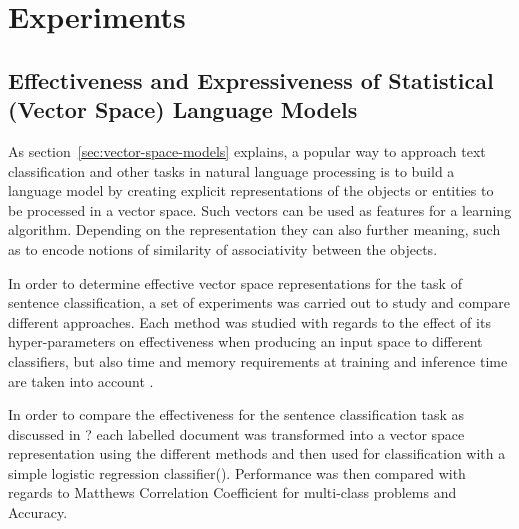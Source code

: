 
\clearpage
\section{Experiments}


\subsection{Effectiveness and Expressiveness of Statistical (Vector Space) Language Models}


As section~\ref{sec:vector-space-models} explains, a popular way to approach text classification and other tasks in natural language processing is to build a language model by creating explicit representations of the objects or entities to be processed in a vector space. Such vectors can be used as features for a learning algorithm. Depending on the representation they can also further meaning, such as to encode notions of similarity of associativity between the objects.

In order to determine effective vector space representations for the task of sentence classification, a set of experiments was carried out to study and compare different approaches. Each method was studied with regards to the effect of its hyper-parameters on effectiveness when producing an input space to different classifiers, but also time and memory requirements at training and inference time are taken into account .

In order to compare the effectiveness for the sentence classification task as discussed in ? each labelled document was transformed into a vector space representation using the different methods and then used for classification with a simple logistic regression classifier(). Performance was then compared with regards to Matthews Correlation Coefficient for multi-class problems  and Accuracy.

